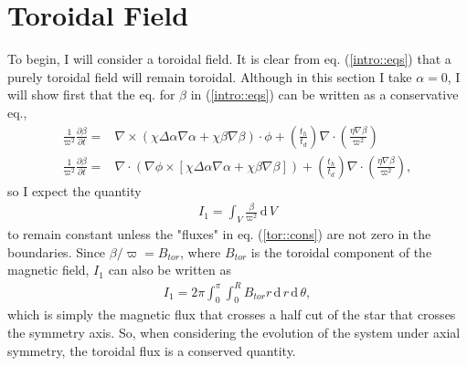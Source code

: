 \documentclass[letterpaper,10pt]{article}
\newcommand{\dd}{\,\mathrm{d}\,}
\newcommand{\pp}{\partial}
\begin{document}
\section{Toroidal Field}
To begin, I will consider a toroidal field. It is clear from eq. (\ref{intro::eqs}) that a purely toroidal field will remain toroidal. Although in this section I take $\alpha=0$, I will show first that the eq. for $\beta$ in (\ref{intro::eqs}) can be written as a conservative eq.,
\begin{eqnarray}
\frac{1}{\varpi^2}\frac{\pp\beta}{\pp t}=&\nabla\times(\chi\Delta\alpha\nabla\alpha+\chi\beta\nabla\beta)\cdot\phi+\left(\frac{t_h}{t_d}\right)\nabla\cdot\left(\frac{\eta\nabla\beta}{\varpi^2}\right)\\
\frac{1}{\varpi^2}\frac{\pp\beta}{\pp t}=&\nabla\cdot(\nabla\phi\times[\chi\Delta\alpha\nabla\alpha+\chi\beta\nabla\beta])+\left(\frac{t_h}{t_d}\right)\nabla\cdot\left(\frac{\eta\nabla\beta}{\varpi^2}\right),\label{tor::cons}
\end{eqnarray}
so I expect the quantity
\begin{eqnarray}
I_1=\int_V\frac{\beta}{\varpi^2}\dd V
\end{eqnarray}
to remain constant unless the "fluxes" in eq. (\ref{tor::cons}) are not zero in the boundaries. Since $\beta/\varpi=B_{tor}$, where $B_{tor}$ is the toroidal component of the magnetic field, $I_1$ can also be written as
\begin{eqnarray}
I_1=2\pi\int_0^\pi\int_0^R B_{tor}r\dd r\dd\theta,
\end{eqnarray}
which is simply the magnetic flux that crosses a half cut of the star that crosses the symmetry axis. So, when considering the evolution of the system under axial symmetry, the toroidal flux is a conserved quantity.
\end{document}
